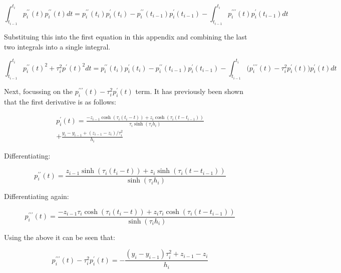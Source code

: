 \documentclass{article}
\begin{document}
\begin{equation}
    \int_{t_{i - 1}}^{t_i}p^{\prime\prime}_i(t) p^{\prime\prime}_i(t) dt = 
    p^{\prime\prime}_i(t_i) p^{\prime}_i(t_i) - p^{\prime\prime}_i(t_{i - 1}) p^{\prime}_i(t_{i - 1})
    - \int_{t_{i - 1}}^{t_i} p^{\prime\prime\prime}_i(t) p^{\prime}_i(t_{i - 1}) dt
\end{equation}

Substituing this into the first equation in this appendix and combining the last two integrals
into a single integral.

\begin{equation}
    \int_{t_{i - 1}}^{t_i}p^{\prime\prime}_i(t)^2 + \tau_i^2 p^{\prime}(t)^2 dt
    = p^{\prime\prime}_i(t_i) p^{\prime}_i(t_i) - p^{\prime\prime}_i(t_{i - 1}) p^{\prime}_i(t_{i - 1})
    - \int_{t_{i - 1}}^{t_i} \bigl( p^{\prime\prime\prime}_i(t) - \tau_i^2 p^{\prime}_i(t) \bigr) p^{\prime}_i(t) dt
\end{equation}

Next, focussing on the $p^{\prime\prime\prime}_i(t) - \tau_i^2 p^{\prime}_i(t)$ term. It has previously been
shown that the first derivative is as follows:

\begin{multline}
    p^\prime_i(t) = \frac{ -z_{i-1} \cosh(\tau_i (t_i - t)) + z_i \cosh(\tau_i (t - t_{i-1}))}{\tau_i \sinh(\tau_i h_i)}  \\
        + \frac{y_i - y_{i-1} +  (z_{i-1} - z_i)/\tau_i^2}{h_i}
\end{multline}

Differentiating:

\begin{equation}
    p^{\prime\prime}_i(t) = \frac{ z_{i-1} \sinh(\tau_i (t_i - t)) + z_i \sinh(\tau_i (t - t_{i-1}))}{\sinh(\tau_i h_i)}
\end{equation}

Differentiating again:

\begin{equation}
    p^{\prime\prime\prime}_i(t) = \frac{ -z_{i-1} \tau_i \cosh(\tau_i (t_i - t)) + z_i \tau_i \cosh(\tau_i (t - t_{i-1}))}{\sinh(\tau_i h_i)}
\end{equation}

Using the above it can be seen that:

\begin{equation}
    p^{\prime\prime\prime}_i(t) - \tau_i^2 p^{\prime}_i(t) =
    - \frac{(y_i - y_{i-1})\tau_i^2 +  z_{i-1} - z_i}{h_i}
\end{equation}
\end{document}
